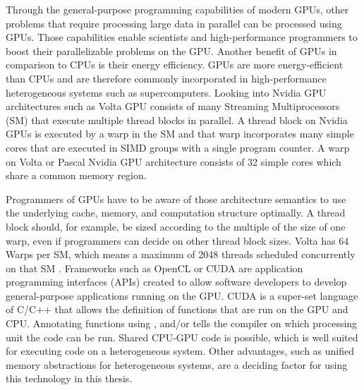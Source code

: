 Through the general-purpose programming capabilities of modern GPUs, other problems that require processing large data in parallel can be processed using GPUs. Those capabilities enable scientists and high-performance programmers to boost their parallelizable problems on the GPU.
Another benefit of GPUs in comparison to CPUs is their energy efficiency. GPUs are more energy-efficient than CPUs and are therefore commonly incorporated in high-performance heterogeneous systems such as supercomputers.
Looking into Nvidia GPU architectures such as Volta \cite{NVIDIATESLAV1002017} GPU consists of many Streaming Multiprocessors (SM) that execute multiple thread blocks in parallel. A thread block on Nvidia GPUs is executed by a warp in the SM and that warp incorporates many simple cores that are executed in SIMD groups with a single program counter. A warp on Volta or Pascal Nvidia GPU architecture consists of 32 simple cores which share a common memory region.

Programmers of GPUs have to be aware of those architecture semantics to use the underlying cache, memory, and computation structure optimally. A thread block should, for example, be sized according to the multiple of the size of one warp, even if programmers can decide on other thread block sizes. Volta has 64 Warps per SM, which means a maximum of 2048 threads scheduled concurrently on that SM \cite{NVIDIATESLAV1002017}.
Frameworks such as OpenCL or CUDA are application programming interfaces (APIs) created to allow software developers to develop general-purpose applications running on the GPU. CUDA is a super-set language of C/C++ that allows the definition of functions that are run on the GPU and CPU. Annotating functions using \texttt{}, \texttt{} and/or \texttt{} tells the compiler on which processing unit the code can be run. Shared CPU-GPU code is possible, which is well suited for executing code on a heterogeneous system. Other advantages, such as unified memory abstractions for heterogeneous systems, are a deciding factor for using this technology in this thesis.

